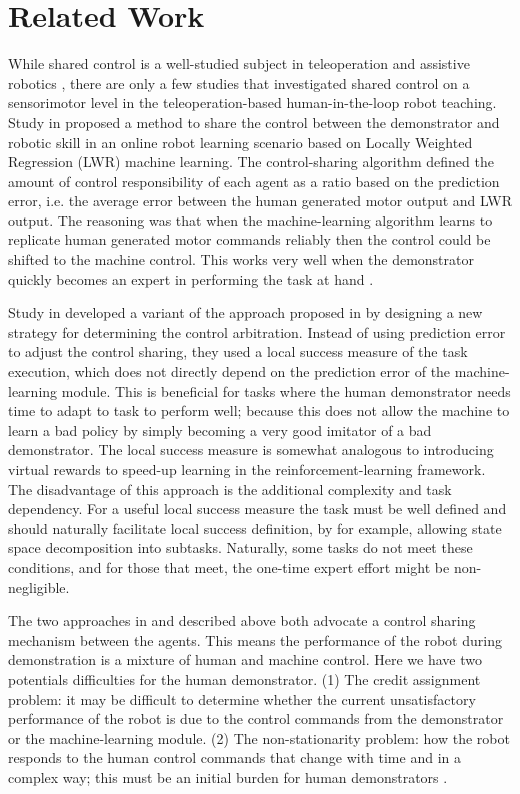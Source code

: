 \section{Related Work}
\label{sec:related}
While shared control is a well-studied subject in teleoperation \cite{Niemeyer2008,Dragan2013} and assistive robotics \cite{Omalley2006,Dragan2013,Jain2015,Peternel2016}, there are only a few studies that investigated shared control on a sensorimotor level in the teleoperation-based human-in-the-loop robot teaching. Study in \cite{Peternel2013b} proposed a method to share the control between the demonstrator and robotic skill in an online robot learning scenario based on Locally Weighted Regression (LWR) \cite{Schaal1998,Vijayakumar2005} machine learning. The control-sharing algorithm defined the amount of control responsibility of each agent as a ratio based on the prediction error, i.e. the average error between the human generated motor output and LWR output. The reasoning was that when the machine-learning algorithm learns to replicate human generated motor commands reliably then the control could be shifted to the machine control. This works very well when the demonstrator quickly becomes an expert in performing the task at hand \cite{Peternel2013b}.

Study in \cite{Zamani2015} developed a variant of the approach proposed in \cite{Peternel2013b} by designing a new strategy for determining the control arbitration. Instead of using prediction error to adjust the control sharing, they used a local success measure of the task execution, which does not directly depend on the prediction error of the machine-learning module. This is beneficial for tasks where the human demonstrator needs time to adapt to task to perform well; because this does not allow the machine to learn a bad policy by simply becoming a very good imitator of a bad demonstrator. The local success measure is somewhat analogous to introducing virtual rewards to speed-up learning in the reinforcement-learning framework. The disadvantage of this approach is the additional complexity and task dependency. For a useful local success measure the task must be well defined and should naturally facilitate local success definition, by for example, allowing state space decomposition into subtasks. Naturally, some tasks do not meet these conditions, and for those that meet, the one-time expert effort might be non-negligible.

The two approaches in \cite{Peternel2013b} and \cite{Zamani2015} described above both advocate a control sharing mechanism between the agents. This means the performance of the robot during demonstration is a mixture of human and machine control. Here we have two potentials difficulties for the human demonstrator. (1) The credit assignment problem: it may be difficult to determine whether the current unsatisfactory performance of the robot is due to the control commands from the demonstrator or the machine-learning module. (2) The non-stationarity problem: how the robot responds to the human control commands that change with time and in a complex way; this must be an initial burden for human demonstrators \cite{Zamani2015}.

